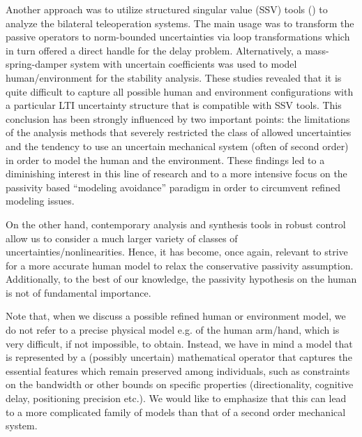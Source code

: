 Another approach was to utilize structured singular value (SSV) tools (\cite{colgate1, colgate2, colgate3, yokokohjiyoshikawa,leungfa, kazeroonitsay, husalculoewen,andrifour}) to analyze the bilateral teleoperation systems. The main usage was to transform the passive operators to norm-bounded uncertainties via loop transformations which in turn offered a direct handle for the delay problem. Alternatively, a mass-spring-damper system with uncertain coefficients was used to model human/environment for the stability analysis. These studies revealed that it is quite difficult to capture all possible human and environment configurations with a particular LTI uncertainty structure that is compatible with SSV tools. This conclusion has been strongly influenced by two important points: the limitations of the analysis methods that severely restricted the class of allowed uncertainties and the tendency to use an uncertain mechanical system (often of second order) in order to model the human and the environment. These findings led to a diminishing interest in this line of research and to a more intensive focus on the passivity based ``modeling avoidance'' paradigm in order to circumvent refined modeling issues.


On the other hand, contemporary analysis and synthesis tools in robust control allow us to consider a much larger variety of classes of uncertainties/nonlinearities. Hence, it has become, once again, relevant to strive for a more accurate human model to relax the conservative passivity assumption. Additionally, to the best of our knowledge, the passivity hypothesis on the human is not of fundamental importance.


Note that, when we discuss a possible refined human or environment model, we do not refer to a precise physical model e.g. of the human arm/hand, which is very difficult, if not impossible, to obtain. Instead, we have in mind a model that is represented by a (possibly uncertain) mathematical operator that captures the essential features which remain preserved among individuals, such as constraints on the bandwidth or other bounds on specific properties (directionality, cognitive delay, positioning precision etc.). We would like to emphasize that this can lead to a more complicated family of models than that of a second order mechanical system.


